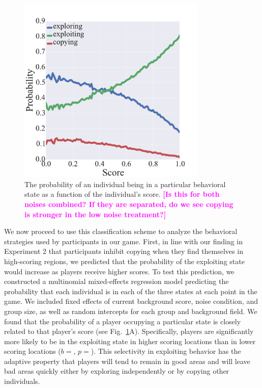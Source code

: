 \documentclass[12pt,letterpaper]{article}
\newcommand{\andrew}[1]{\textcolor{magenta}{\bf [#1]}}
\begin{document}
\begin{figure}[t!]
  \centering
  \includegraphics[width=0.8\textwidth]{./figures/states}
  \caption{The probability of an individual being in a particular
    behavioral state as a function of the individual's score. \andrew{Is this for both noises combined?  If they are separated, do we see copying is stronger in the low noise treatment?}}
  \label{fig:states}
\end{figure}

We now proceed to use this classification scheme to analyze the behavioral strategies used by participants in our game.
First, in line with our finding in Experiment 2 that participants inhibit copying when they find themselves in high-scoring regions, we predicted that the probability of the exploiting state would increase as players receive higher scores.  
To test this prediction, we constructed a multinomial mixed-effects regression model predicting the probability that each individual is in each of the three states at each point in the game. 
We included fixed effects of current background score, noise condition, and group size, as well as random intercepts for each group and background field.
We found that the probability of a player occupying a particular state is closely related to that player's score (see Fig.~\ref{fig:states}A). 
Specifically, players are significantly more likely to be in the exploiting state in higher scoring locations than in lower scoring locations ($b=$, $p=$).
This selectivity in exploiting behavior has the adaptive property that players will tend to remain in good areas and will leave bad areas quickly either by exploring independently or by copying other individuals.
\end{document}
